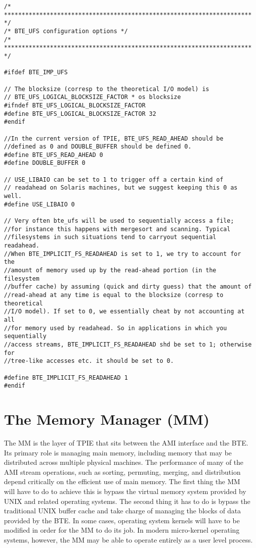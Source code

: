 \begin{verbatim}
/* ********************************************************************** */
/* BTE_UFS configuration options */
/* ********************************************************************** */

#ifdef BTE_IMP_UFS

// The blocksize (corresp to the theoretical I/O model) is 
// BTE_UFS_LOGICAL_BLOCKSIZE_FACTOR * os blocksize 
#ifndef BTE_UFS_LOGICAL_BLOCKSIZE_FACTOR
#define BTE_UFS_LOGICAL_BLOCKSIZE_FACTOR 32
#endif

//In the current version of TPIE, BTE_UFS_READ_AHEAD should be
//defined as 0 and DOUBLE_BUFFER should be defined 0. 
#define BTE_UFS_READ_AHEAD 0
#define DOUBLE_BUFFER 0

// USE_LIBAIO can be set to 1 to trigger off a certain kind of 
// readahead on Solaris machines, but we suggest keeping this 0 as well.
#define USE_LIBAIO 0

// Very often bte_ufs will be used to sequentially access a file;
//for instance this happens with mergesort and scanning. Typical
//filesystems in such situations tend to carryout sequential readahead.
//When BTE_IMPLICIT_FS_READAHEAD is set to 1, we try to account for the
//amount of memory used up by the read-ahead portion (in the filesystem
//buffer cache) by assuming (quick and dirty guess) that the amount of
//read-ahead at any time is equal to the blocksize (corresp to theoretical
//I/O model). If set to 0, we essentially cheat by not accounting at all
//for memory used by readahead. So in applications in which you sequentially
//access streams, BTE_IMPLICIT_FS_READAHEAD shd be set to 1; otherwise for
//tree-like accesses etc. it should be set to 0.

#define BTE_IMPLICIT_FS_READAHEAD 1
#endif
\end{verbatim}



\section{The Memory Manager (MM)}
\label{sec:ref-mm}

The MM is the layer of TPIE that sits between the AMI interface and the
BTE.  Its primary role is managing main memory, including memory that
may be distributed across multiple physical machines.  The performance
of many of the AMI stream operations, such as sorting, permuting,
merging, and distribution depend critically on the efficient use of
main memory.  The first thing the MM will have to do to achieve this
is bypass the virtual memory system provided by UNIX and related
operating systems.  The second thing it has to do is bypass the
traditional UNIX buffer cache and take charge of managing the blocks
of data provided by the BTE.  In some cases, operating system kernels
will have to be modified in order for the MM to do its job.  In modern
micro-kernel operating systems, however, the MM may be able to operate
entirely as a user level process.

